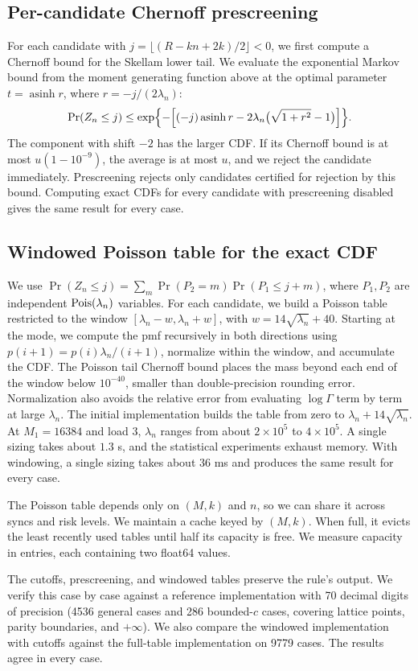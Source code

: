 \subsection{Per-candidate Chernoff prescreening}
For each candidate with $j=\lfloor(R-kn+2k)/2\rfloor<0$, we first compute a Chernoff bound for the Skellam lower tail. We evaluate the exponential Markov bound from the moment generating function above at the optimal parameter $t=\operatorname{asinh}r$, where $r=-j/(2\lambda_n)$:
\begin{equation*}
\Pr(Z_n\le j)\le\exp\Bigl\{-\Bigl[(-j)\operatorname{asinh}r-2\lambda_n\bigl(\sqrt{1+r^2}-1\bigr)\Bigr]\Bigr\}.
\end{equation*}
The component with shift $-2$ has the larger CDF. If its Chernoff bound is at most $u(1-10^{-9})$, the average is at most $u$, and we reject the candidate immediately. Prescreening rejects only candidates certified for rejection by this bound. Computing exact CDFs for every candidate with prescreening disabled gives the same result for every case.

\subsection{Windowed Poisson table for the exact CDF}
We use $\Pr(Z_n\le j)=\sum_m\Pr(P_2=m)\Pr(P_1\le j+m)$, where $P_1,P_2$ are independent $\operatorname{Pois}(\lambda_n)$ variables. For each candidate, we build a Poisson table restricted to the window $[\lambda_n-w,\lambda_n+w]$, with $w=14\sqrt{\lambda_n}+40$. Starting at the mode, we compute the pmf recursively in both directions using $p(i+1)=p(i)\lambda_n/(i+1)$, normalize within the window, and accumulate the CDF. The Poisson tail Chernoff bound places the mass beyond each end of the window below $10^{-40}$, smaller than double-precision rounding error. Normalization also avoids the relative error from evaluating $\log\Gamma$ term by term at large $\lambda_n$. The initial implementation builds the table from zero to $\lambda_n+14\sqrt{\lambda_n}$. At $M_1=16384$ and load $3$, $\lambda_n$ ranges from about $2\times10^5$ to $4\times10^5$. A single sizing takes about $1.3$ s, and the statistical experiments exhaust memory. With windowing, a single sizing takes about $36$ ms and produces the same result for every case.

The Poisson table depends only on $(M,k)$ and $n$, so we can share it across syncs and risk levels. We maintain a cache keyed by $(M,k)$. When full, it evicts the least recently used tables until half its capacity is free. We measure capacity in entries, each containing two float64 values.

The cutoffs, prescreening, and windowed tables preserve the rule's output. We verify this case by case against a reference implementation with 70 decimal digits of precision (4536 general cases and 286 bounded-$c$ cases, covering lattice points, parity boundaries, and $+\infty$). We also compare the windowed implementation with cutoffs against the full-table implementation on 9779 cases. The results agree in every case.
